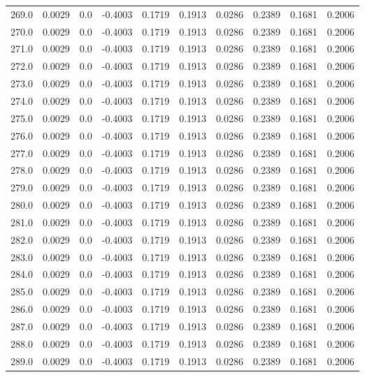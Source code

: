 \begin{longtable}{lrrrrrrrrr}
269.0 & 0.0029 & 0.0 & -0.4003 & 0.1719 & 0.1913 & 0.0286 & 0.2389 & 0.1681 & 0.2006 \\
270.0 & 0.0029 & 0.0 & -0.4003 & 0.1719 & 0.1913 & 0.0286 & 0.2389 & 0.1681 & 0.2006 \\
271.0 & 0.0029 & 0.0 & -0.4003 & 0.1719 & 0.1913 & 0.0286 & 0.2389 & 0.1681 & 0.2006 \\
272.0 & 0.0029 & 0.0 & -0.4003 & 0.1719 & 0.1913 & 0.0286 & 0.2389 & 0.1681 & 0.2006 \\
273.0 & 0.0029 & 0.0 & -0.4003 & 0.1719 & 0.1913 & 0.0286 & 0.2389 & 0.1681 & 0.2006 \\
274.0 & 0.0029 & 0.0 & -0.4003 & 0.1719 & 0.1913 & 0.0286 & 0.2389 & 0.1681 & 0.2006 \\
275.0 & 0.0029 & 0.0 & -0.4003 & 0.1719 & 0.1913 & 0.0286 & 0.2389 & 0.1681 & 0.2006 \\
276.0 & 0.0029 & 0.0 & -0.4003 & 0.1719 & 0.1913 & 0.0286 & 0.2389 & 0.1681 & 0.2006 \\
277.0 & 0.0029 & 0.0 & -0.4003 & 0.1719 & 0.1913 & 0.0286 & 0.2389 & 0.1681 & 0.2006 \\
278.0 & 0.0029 & 0.0 & -0.4003 & 0.1719 & 0.1913 & 0.0286 & 0.2389 & 0.1681 & 0.2006 \\
279.0 & 0.0029 & 0.0 & -0.4003 & 0.1719 & 0.1913 & 0.0286 & 0.2389 & 0.1681 & 0.2006 \\
280.0 & 0.0029 & 0.0 & -0.4003 & 0.1719 & 0.1913 & 0.0286 & 0.2389 & 0.1681 & 0.2006 \\
281.0 & 0.0029 & 0.0 & -0.4003 & 0.1719 & 0.1913 & 0.0286 & 0.2389 & 0.1681 & 0.2006 \\
282.0 & 0.0029 & 0.0 & -0.4003 & 0.1719 & 0.1913 & 0.0286 & 0.2389 & 0.1681 & 0.2006 \\
283.0 & 0.0029 & 0.0 & -0.4003 & 0.1719 & 0.1913 & 0.0286 & 0.2389 & 0.1681 & 0.2006 \\
284.0 & 0.0029 & 0.0 & -0.4003 & 0.1719 & 0.1913 & 0.0286 & 0.2389 & 0.1681 & 0.2006 \\
285.0 & 0.0029 & 0.0 & -0.4003 & 0.1719 & 0.1913 & 0.0286 & 0.2389 & 0.1681 & 0.2006 \\
286.0 & 0.0029 & 0.0 & -0.4003 & 0.1719 & 0.1913 & 0.0286 & 0.2389 & 0.1681 & 0.2006 \\
287.0 & 0.0029 & 0.0 & -0.4003 & 0.1719 & 0.1913 & 0.0286 & 0.2389 & 0.1681 & 0.2006 \\
288.0 & 0.0029 & 0.0 & -0.4003 & 0.1719 & 0.1913 & 0.0286 & 0.2389 & 0.1681 & 0.2006 \\
289.0 & 0.0029 & 0.0 & -0.4003 & 0.1719 & 0.1913 & 0.0286 & 0.2389 & 0.1681 & 0.2006 \\

\end{longtable}
